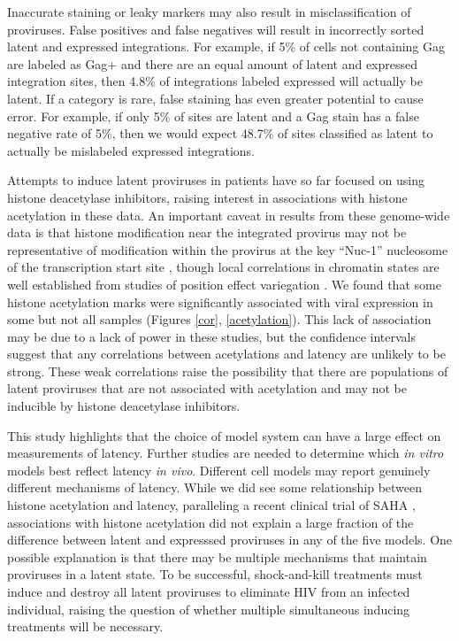 \documentclass[../sherrill-Mix_thesis.tex]{subfiles}
\begin{document}
	Inaccurate staining or leaky markers may also result in misclassification of proviruses. False positives and false negatives will result in incorrectly sorted latent and expressed integrations. For example, if 5\% of cells not containing Gag are labeled as Gag+ and there are an equal amount of latent and expressed integration sites, then 4.8\% of integrations labeled expressed will actually be latent. If a category is rare, false staining has even greater potential to cause error. For example, if only 5\% of sites are latent and a Gag stain has a false negative rate of 5\%, then we would expect 48.7\% of sites classified as latent to actually be mislabeled expressed integrations.

	Attempts to induce latent proviruses in patients have so far focused on using histone deacetylase inhibitors, raising interest in associations with histone acetylation in these data. An important caveat in results from these genome-wide data is that histone modification near the integrated provirus may not be representative of modification within the provirus at the key ``Nuc-1'' nucleosome of the transcription start site \citep{Lint1996}, though local correlations in chromatin states are well established from studies of position effect variegation \citep{Muller1930,Gaszner2006}. We found that some histone acetylation marks were significantly associated with viral expression in some but not all samples (Figures \ref{cor}, \ref{acetylation}). This lack of association may be due to a lack of power in these studies, but the confidence intervals suggest that any correlations between acetylations and latency are unlikely to be strong.  These weak correlations raise the possibility that there are populations of latent proviruses that are not associated with acetylation and may not be inducible by histone deacetylase inhibitors.


	This study highlights that the choice of model system can have a large effect on measurements of latency. Further studies are needed to determine which \textit{in vitro} models best reflect latency \textit{in vivo}. Different cell models may report genuinely different mechanisms of latency. While we did see some relationship between histone acetylation and latency, paralleling a recent clinical trial of SAHA \citep{Archin2012}, associations with histone acetylation did not explain a large fraction of the difference between latent and expresssed proviruses in any of the five models. One possible explanation is that there  may be multiple mechanisms that maintain proviruses in a latent state. To be successful, shock-and-kill treatments must induce and destroy all latent proviruses to eliminate HIV from an infected individual, raising the question of whether multiple simultaneous inducing treatments will be necessary. %
	
\end{document}
